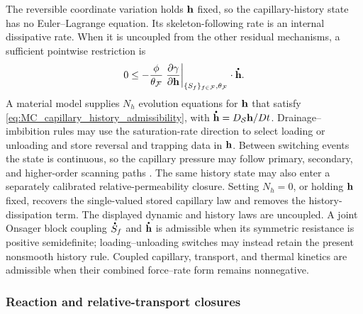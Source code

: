 The reversible coordinate variation holds \(\mathbf{h}\) fixed, so the
capillary-history state has no Euler--Lagrange equation.  Its skeleton-following
rate is an internal dissipative rate.  When it is uncoupled from the other
residual mechanisms, a sufficient pointwise restriction is
%
\begin{equation}
	0
	\le
	-
	\frac{\phi}{\theta_{\mc F}}
	\left.
	\p{\gamma}{\mbf h}
	\right\vert_{\{S_f\}_{f\in\mc F},\theta_{\mc F}}
	\cdot\phasedot{\mbf h} .
	\label{eq:MC_capillary_history_admissibility}
\end{equation}
%
A material model supplies \(N_h\) evolution equations for \(\mathbf{h}\) that
satisfy \eqref{eq:MC_capillary_history_admissibility}, with
\(\phasedot{\mbf h}=D_{\mc S}\mbf h/Dt\).  Drainage--imbibition rules may use the
saturation-rate direction to select loading or unloading and store reversal and
trapping data in \(\mathbf{h}\).  Between switching events the state is continuous,
so the capillary pressure may follow primary, secondary, and higher-order
scanning paths \cite{wei2006capillary_hysteresis}.  The same history state may
also enter a separately calibrated relative-permeability closure.
Setting \(N_h=0\), or holding \(\mathbf{h}\) fixed, recovers the single-valued
stored capillary law and removes the history-dissipation term.  The displayed
dynamic and history laws are uncoupled.  A joint Onsager block coupling
\(\phasedot S_f\) and \(\phasedot{\mbf h}\) is admissible when its symmetric resistance
is positive semidefinite; loading--unloading switches may instead retain the
present nonsmooth history rule.  Coupled capillary, transport, and thermal
kinetics are admissible when their combined force--rate form remains
nonnegative.

\subsubsection{Reaction and relative-transport closures}
\label{sec:MC_reaction_transport_closures}

